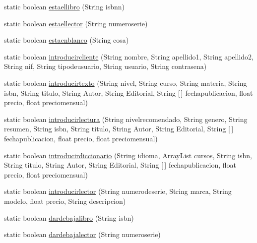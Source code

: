 \begin{DoxyCompactItemize}
\item 
static boolean \mbox{\hyperlink{classlibreria_1_1_libreria_a0af77d7fa2b6f3c0a0b218ee9df08ce3}{estaellibro}} (String isbnn)
\item 
static boolean \mbox{\hyperlink{classlibreria_1_1_libreria_a1d272b2c2f64bbeaa6e24f4f8c5ba2e7}{estaellector}} (String numeroserie)
\item 
static boolean \mbox{\hyperlink{classlibreria_1_1_libreria_afca98a0ea16507ff5cc9bc0dde706abb}{estaenblanco}} (String cosa)
\item 
static boolean \mbox{\hyperlink{classlibreria_1_1_libreria_a0c70e18fd24cf773ee523d7fb77fd5b6}{introducircliente}} (String nombre, String apellido1, String apellido2, String nif, String tipodeusuario, String usuario, String contrasena)
\item 
static boolean \mbox{\hyperlink{classlibreria_1_1_libreria_a4e350d17616aa0869662e953ed4430e9}{introducirtexto}} (String nivel, String curso, String materia, String isbn, String titulo, String Autor, String Editorial, String \mbox{[}$\,$\mbox{]} fechapublicacion, float precio, float preciomensual)
\item 
static boolean \mbox{\hyperlink{classlibreria_1_1_libreria_aa5450eb41fd6d88d4a26514245729842}{introducirlectura}} (String nivelrecomendado, String genero, String resumen, String isbn, String titulo, String Autor, String Editorial, String \mbox{[}$\,$\mbox{]} fechapublicacion, float precio, float preciomensual)
\item 
static boolean \mbox{\hyperlink{classlibreria_1_1_libreria_a97c39db00171d7084a2f73562dc9e77f}{introducirdiccionario}} (String idioma, Array\+List cursos, String isbn, String titulo, String Autor, String Editorial, String \mbox{[}$\,$\mbox{]} fechapublicacion, float precio, float preciomensual)
\item 
static boolean \mbox{\hyperlink{classlibreria_1_1_libreria_a5582b1ac3c3a9cd393a92128c2f77dce}{introducirlector}} (String numerodeserie, String marca, String modelo, float precio, String descripcion)
\item 
static boolean \mbox{\hyperlink{classlibreria_1_1_libreria_adea7dde2dd160bf72da7a33b981dbf8f}{dardebajalibro}} (String isbn)
\item 
static boolean \mbox{\hyperlink{classlibreria_1_1_libreria_a6ebb6d0b3c9f63404c54ffe69d67d495}{dardebajalector}} (String numeroserie)
\end{DoxyCompactItemize}
